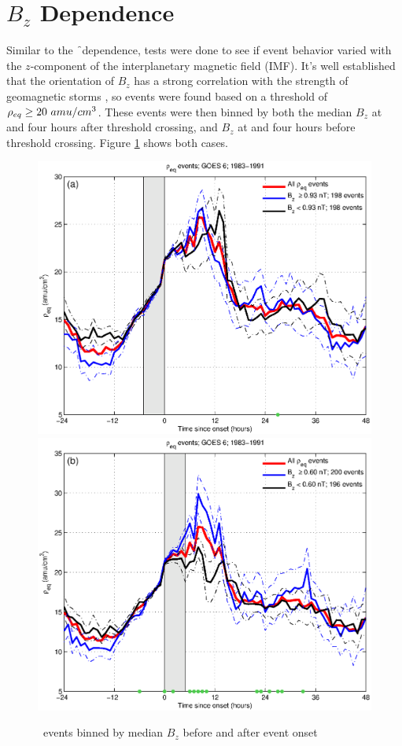 \section{$B_z$ Dependence}

Similar to the \f\ dependence, tests were done to see if event behavior varied with the $z$-component of the interplanetary magnetic field (IMF). It's well established that the orientation of $B_z$ has a strong correlation with the strength of geomagnetic storms \citep{Takahashi2010SolarCycleVariation}, so events were found based on a threshold of $\rho_{eq} \geq 20~amu/cm^3$. These events were then binned by both the median $B_z$ at and four hours after threshold crossing, and $B_z$ at and four hours before threshold crossing. Figure \ref{fig:RhoBinnedBz} shows both cases.

\begin{figure}[htp!]
	\centering
	\includegraphics[width=0.7\linewidth]{Figures/RhoBinnedBz-case24-t020-tf25-GOES6}
	\includegraphics[width=0.7\linewidth]{Figures/RhoBinnedBz-case24-t025-tf30-GOES6}	
	\caption{\req\ events binned by median $B_z$ before and after event onset}
	\label{fig:RhoBinnedBz}
\end{figure}

